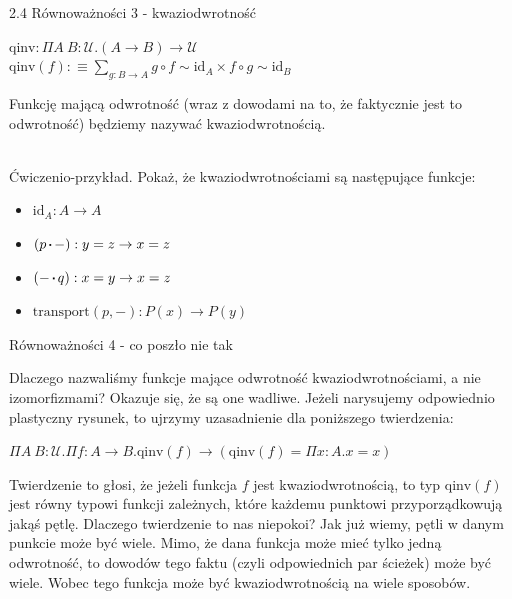 \documentclass{beamer}
\newcommand{\U}{\mathcal{U}}
\newcommand*\sq{\mathbin{\vcenter{\hbox{\rule{.3ex}{.3ex}}}}}
\newcommand{\qinv}{\text{qinv}}
\newcommand{\id}{\text{id}}
\newcommand{\comp}{\circ}
\newcommand{\transport}{\text{transport}}
\begin{document}
\begin{frame}{2.4 Równoważności 3 - kwaziodwrotność}

\begin{definition}
$\qinv : \Pi A\ B : \U. (A \to B) \to \U$ \\
$\displaystyle \qinv(f) :\equiv \sum_{g : B \to A} g \comp f \sim \id_A \times f \comp g \sim \id_B$
\end{definition}

Funkcję mającą odwrotność (wraz z dowodami na to, że faktycznie jest to odwrotność) będziemy nazywać kwaziodwrotnością. \\~\

Ćwiczenio-przykład. Pokaż, że kwaziodwrotnościami są następujące funkcje:
\begin{itemize}
	\item $\id_A : A \to A$
	\item $(p \sq -) : y = z \to x = z$
	\item $(- \sq q) : x = y \to x = z$
	\item $\transport(p, -) : P(x) \to P(y)$
\end{itemize}

\end{frame}

\begin{frame}{Równoważności 4 - co poszło nie tak}

Dlaczego nazwaliśmy funkcje mające odwrotność kwaziodwrotnościami, a nie izomorfizmami? Okazuje się, że są one wadliwe. Jeżeli narysujemy odpowiednio plastyczny rysunek, to ujrzymy uzasadnienie dla poniższego twierdzenia:

\begin{theorem}

$\Pi A\ B : \U. \Pi f : A \to B. \qinv(f) \to (\qinv(f) = \Pi x : A. x = x)$

\end{theorem}

Twierdzenie to głosi, że jeżeli funkcja $f$ jest kwaziodwrotnością, to typ $\qinv(f)$ jest równy typowi funkcji zależnych, które każdemu punktowi przyporządkowują jakąś pętlę. Dlaczego twierdzenie to nas niepokoi? Jak już wiemy, pętli w danym punkcie może być wiele. Mimo, że dana funkcja może mieć tylko jedną odwrotność, to dowodów tego faktu (czyli odpowiednich par ścieżek) może być wiele. Wobec tego funkcja może być kwaziodwrotnością na wiele sposobów.

\end{frame}
\end{document}
